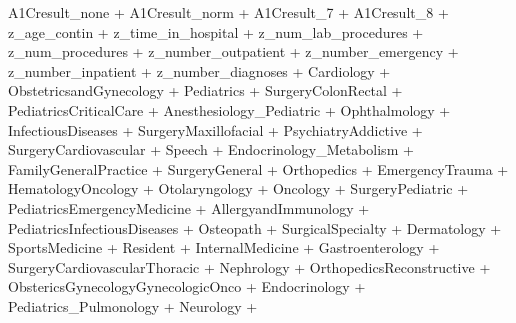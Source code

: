 \documentclass[
]{article}
\newenvironment{Shaded}{\begin{snugshade}}{\end{snugshade}}
\newcommand{\NormalTok}[1]{#1}
\newcommand{\SpecialCharTok}[1]{\textcolor[rgb]{0.00,0.00,0.00}{#1}}
\begin{document}
\begin{Shaded}
\begin{Highlighting}[]
\NormalTok{        A1Cresult\_none }\SpecialCharTok{+}\NormalTok{ A1Cresult\_norm }\SpecialCharTok{+}\NormalTok{ A1Cresult\_7 }\SpecialCharTok{+}
\NormalTok{        A1Cresult\_8 }\SpecialCharTok{+}\NormalTok{ z\_age\_contin }\SpecialCharTok{+}\NormalTok{ z\_time\_in\_hospital }\SpecialCharTok{+}
\NormalTok{        z\_num\_lab\_procedures }\SpecialCharTok{+}\NormalTok{ z\_num\_procedures }\SpecialCharTok{+}\NormalTok{ z\_number\_outpatient }\SpecialCharTok{+}
\NormalTok{        z\_number\_emergency }\SpecialCharTok{+}\NormalTok{ z\_number\_inpatient }\SpecialCharTok{+}\NormalTok{ z\_number\_diagnoses }\SpecialCharTok{+}
\NormalTok{        Cardiology }\SpecialCharTok{+}\NormalTok{ ObstetricsandGynecology }\SpecialCharTok{+}\NormalTok{ Pediatrics }\SpecialCharTok{+}
\NormalTok{        SurgeryColonRectal }\SpecialCharTok{+}\NormalTok{ PediatricsCriticalCare }\SpecialCharTok{+}
\NormalTok{        Anesthesiology\_Pediatric }\SpecialCharTok{+}\NormalTok{ Ophthalmology }\SpecialCharTok{+}
\NormalTok{        InfectiousDiseases }\SpecialCharTok{+}\NormalTok{ SurgeryMaxillofacial }\SpecialCharTok{+}
\NormalTok{        PsychiatryAddictive }\SpecialCharTok{+}\NormalTok{ SurgeryCardiovascular }\SpecialCharTok{+}
\NormalTok{        Speech }\SpecialCharTok{+}\NormalTok{ Endocrinology\_Metabolism }\SpecialCharTok{+}\NormalTok{ FamilyGeneralPractice }\SpecialCharTok{+}
\NormalTok{        SurgeryGeneral }\SpecialCharTok{+}\NormalTok{ Orthopedics }\SpecialCharTok{+}\NormalTok{ EmergencyTrauma }\SpecialCharTok{+}
\NormalTok{        HematologyOncology }\SpecialCharTok{+}\NormalTok{ Otolaryngology }\SpecialCharTok{+}\NormalTok{ Oncology }\SpecialCharTok{+}
\NormalTok{        SurgeryPediatric }\SpecialCharTok{+}\NormalTok{ PediatricsEmergencyMedicine }\SpecialCharTok{+}
\NormalTok{        AllergyandImmunology }\SpecialCharTok{+}\NormalTok{ PediatricsInfectiousDiseases }\SpecialCharTok{+}
\NormalTok{        Osteopath }\SpecialCharTok{+}\NormalTok{ SurgicalSpecialty }\SpecialCharTok{+}\NormalTok{ Dermatology }\SpecialCharTok{+}
\NormalTok{        SportsMedicine }\SpecialCharTok{+}\NormalTok{ Resident }\SpecialCharTok{+}\NormalTok{ InternalMedicine }\SpecialCharTok{+}
\NormalTok{        Gastroenterology }\SpecialCharTok{+}\NormalTok{ SurgeryCardiovascularThoracic }\SpecialCharTok{+}
\NormalTok{        Nephrology }\SpecialCharTok{+}\NormalTok{ OrthopedicsReconstructive }\SpecialCharTok{+}\NormalTok{ ObstericsGynecologyGynecologicOnco }\SpecialCharTok{+}
\NormalTok{        Endocrinology }\SpecialCharTok{+}\NormalTok{ Pediatrics\_Pulmonology }\SpecialCharTok{+}\NormalTok{ Neurology }\SpecialCharTok{+}

\end{Highlighting}
\end{Shaded}
\end{document}
